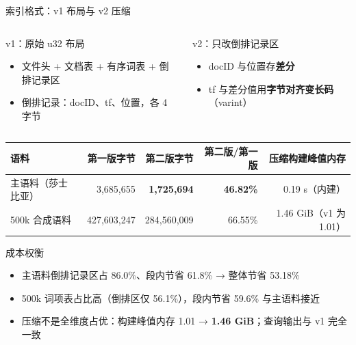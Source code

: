 \documentclass[UTF8,fontset=none,aspectratio=169,10pt]{ctexbeamer}
\newcommand{\key}[1]{\textcolor{accent}{\textbf{#1}}}
\newcommand{\bad}[1]{\textcolor{alertred}{\textbf{#1}}}
\newcommand{\src}[1]{\par\vspace{0.5em}{\fontsize{8}{9.6}\selectfont\color{gray}#1\par}}
\newcommand{\vsp}{\vspace*{\stretch{1}}}
\begin{document}
\begin{frame}{索引格式：v1 布局与 v2 压缩}
  \begin{columns}[T]
    \begin{column}{0.47\textwidth}
      \begin{block}{v1：原始 u32 布局}
        \small
        \begin{itemize}\setlength{\itemsep}{0.1em}
          \item 文件头 + 文档表 + 有序词表 + 倒排记录区
          \item 倒排记录：docID、tf、位置，各 4 字节
        \end{itemize}
      \end{block}
    \end{column}
    \begin{column}{0.49\textwidth}
      \begin{block}{v2：只改倒排记录区}
        \small
        \begin{itemize}\setlength{\itemsep}{0.1em}
          \item docID 与位置存\key{差分}
          \item tf 与差分值用\key{字节对齐变长码}（varint）
        \end{itemize}
      \end{block}
    \end{column}
  \end{columns}
  \vsp
  \begin{center}
  \small
  \begin{tabularx}{0.95\textwidth}{L r r r r}
    \toprule
    语料 & 第一版字节 & 第二版字节 & 第二版/第一版 & 压缩构建峰值内存 \\
    \midrule
    主语料（莎士比亚） & 3,685,655 & \key{1,725,694} & \key{46.82\%} & 0.19 s（内建） \\
    500k 合成语料 & 427,603,247 & 284,560,009 & 66.55\% & 1.46 GiB（v1 为 1.01） \\
    \bottomrule
  \end{tabularx}
  \end{center}
  \vsp
  \begin{block}{成本权衡}
    \footnotesize
    \begin{itemize}\setlength{\itemsep}{0.1em}
      \item 主语料倒排记录区占 86.0\%、段内节省 61.8\% → 整体节省 53.18\%
      \item 500k 词项表占比高（倒排区仅 56.1\%），段内节省 59.6\% 与主语料接近
      \item 压缩不是全维度占优：构建峰值内存 1.01 → \bad{1.46 GiB}；查询输出与 v1 完全一致
    \end{itemize}
  \end{block}
\end{frame}
\end{document}
